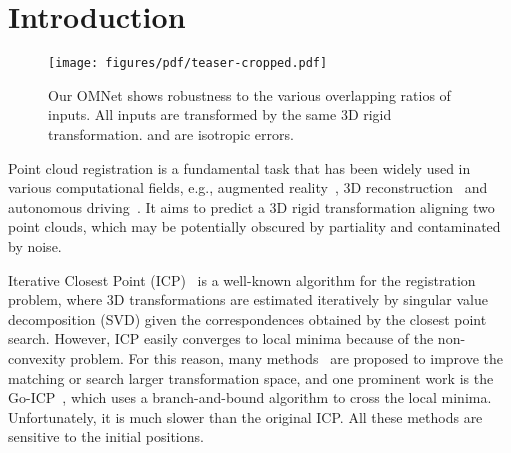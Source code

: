 \documentclass[10pt,twocolumn,letterpaper]{article}
\begin{document}
\section{Introduction}
\begin{figure}[t]
    \centering
    \texttt{[image: figures/pdf/teaser-cropped.pdf]}\\
    \caption{Our OMNet shows robustness to the various overlapping ratios of inputs. All inputs are transformed by the same 3D rigid transformation.  and  are isotropic errors.} 
    \vspace{-0.37cm}
    \label{fig:teaser}
\end{figure} Point cloud registration is a fundamental task that has been widely used in various computational fields, e.g., augmented reality~\cite{azuma1997survey, carmigniani2011augmented, billinghurst2015survey}, 3D reconstruction~\cite{izadi2011kinectfusion, merickel19883d} and autonomous driving~\cite{yurtsever2020survey, geiger2012we}. It aims to predict a 3D rigid transformation aligning two point clouds, which may be potentially obscured by partiality and contaminated by noise.

Iterative Closest Point (ICP)~\cite{besl1992method} is a well-known algorithm for the registration problem, where 3D transformations are estimated iteratively by singular value decomposition (SVD) given the correspondences obtained by the closest point search.
However, ICP easily converges to local minima because of the non-convexity problem.
For this reason, many methods~\cite{rusinkiewicz-normal-sampling, fitzgibbon2003robust, segal2009generalized, bouaziz2013sparse, pomerleau2015review, yang2013go} are proposed to improve the matching or search larger transformation space, and one prominent work is the Go-ICP~\cite{yang2013go}, which uses a branch-and-bound algorithm to cross the local minima. Unfortunately, it is much slower than the original ICP. All these methods are sensitive to the initial positions.
\end{document}
